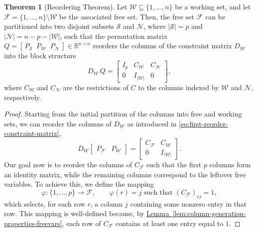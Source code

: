 \documentclass{book}
\theoremstyle{definition}
\newtheorem{theorem}{Theorem}[section]
\newcommand{\lemref}[1]{\hyperref[#1]{Lemma~\ref*{#1}}}
\numberwithin{algorithm_}{chapter}
\begin{document}
\begin{theorem}[Reordering Theorem] \label{th:reordering-theorem}
Let $\mathcal{W} \subseteq \{1, \dots, n\}$ be a working set, and let $\mathcal{F} = \{1, \dots, n\} \setminus \mathcal{W}$ be the associated free set. Then, the free set $\mathcal{F}$ can be partitioned into two disjoint subsets $\mathcal{S}$ and $\mathcal{N}$, where $|\mathcal{S}| = p$ and $|\mathcal{N}| = n - p - |\mathcal{W}|$, such that the permutation matrix $Q = [\, P_\mathcal{S} \;\; P_\mathcal{W} \;\; P_\mathcal{N} \,] \in \mathbb{R}^{n \times n}$ reorders the columns of the constraint matrix $D_\mathcal{W}$ into the block structure
\begin{equation} \label{eq:reordering-theorem}
D_\mathcal{W} \, Q =
\begin{bmatrix}
I_p & C_\mathcal{W} & C_\mathcal{N} \\[0.3em]
0 & I_{|\mathcal{W}|} & 0
\end{bmatrix},
\end{equation}
where $C_\mathcal{W}$ and $C_\mathcal{N}$ are the restrictions of $C$ to the columns indexed by $\mathcal{W}$ and $\mathcal{N}$, respectively.

\begin{proof}
Starting from the initial partition of the columns into free and working sets, we can reorder the columns of $D_\mathcal{W}$ as introduced in \eqref{eq:first-reorder-constraint-matrix}, 
\[
D_\mathcal{W} \begin{bmatrix} P_\mathcal{F} & P_\mathcal{W} \end{bmatrix} =
\begin{bmatrix}
C_\mathcal{F} & C_\mathcal{W} \\[0.6em]
0 & I_{|\mathcal{W}|}
\end{bmatrix}.
\]
Our goal now is to reorder the columns of $C_\mathcal{F}$ such that the first $p$ columns form an identity matrix, while the remaining columns correspond to the leftover free variables. To achieve this, we define the mapping
\begin{equation} \label{eq:reordering_theorem_phi}
\varphi : \{1, \dots, p\} \longrightarrow \mathcal{F}, \qquad
\varphi(r) = j \text{ such that } (C_\mathcal{F})_{r j} = 1,
\end{equation}
which selects, for each row $r$, a column $j$ containing some nonzero entry in that row. This mapping is well-defined because, by \lemref{lem:column-generation-properties-freevars}, each row of $C_\mathcal{F}$ contains at least one entry equal to $1$.


\end{proof}
\end{theorem}
\end{document}
